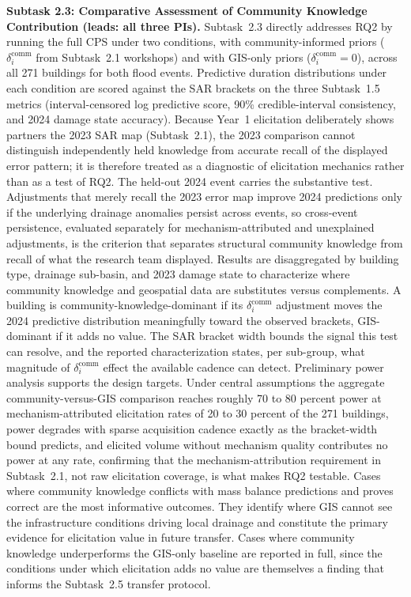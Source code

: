 \documentclass[11pt]{article}
\begin{document}
\textbf{Subtask 2.3: Comparative Assessment of Community Knowledge Contribution
(leads: all three PIs).}
Subtask~2.3 directly addresses RQ2 by running the full CPS under two conditions,
with community-informed priors ($\delta_i^{\mathrm{comm}}$ from Subtask~2.1
workshops) and with GIS-only priors ($\delta_i^{\mathrm{comm}} = 0$), across
all 271 buildings for both flood events.
Predictive duration distributions under each condition are scored against the SAR brackets on the three Subtask~1.5 metrics (interval-censored log predictive score, 90\% credible-interval consistency, and 2024 damage state accuracy).
Because Year~1 elicitation deliberately shows partners the 2023 SAR map
(Subtask~2.1), the 2023 comparison cannot distinguish independently held
knowledge from accurate recall of the displayed error pattern; it is therefore
treated as a diagnostic of elicitation mechanics rather than as a test of RQ2.
The held-out 2024 event carries the substantive test. Adjustments that merely
recall the 2023 error map improve 2024 predictions only if the underlying
drainage anomalies persist across events, so cross-event persistence, evaluated
separately for mechanism-attributed and unexplained adjustments, is the
criterion that separates structural community knowledge from recall of what the
research team displayed.
Results are disaggregated by building type, drainage sub-basin, and 2023 damage state to characterize where community knowledge and geospatial data are substitutes versus complements. A building is community-knowledge-dominant if its $\delta_i^{\mathrm{comm}}$ adjustment moves the 2024 predictive distribution meaningfully toward the observed brackets, GIS-dominant if it adds no value. The SAR bracket width bounds the signal this test can resolve, and the reported characterization states, per sub-group, what magnitude of $\delta_i^{\mathrm{comm}}$ effect the available cadence can detect.
Preliminary power analysis supports the design targets. Under central assumptions the aggregate
community-versus-GIS comparison reaches roughly 70 to 80 percent power at
mechanism-attributed elicitation rates of 20 to 30 percent of the 271 buildings,
power degrades with sparse acquisition cadence exactly as the bracket-width
bound predicts, and elicited volume without mechanism quality contributes no
power at any rate, confirming that the mechanism-attribution requirement in
Subtask~2.1, not raw elicitation coverage, is what makes RQ2 testable.
Cases where community knowledge conflicts with mass balance predictions and proves correct are the most informative outcomes. They identify where GIS cannot see the infrastructure conditions driving local drainage and constitute the primary evidence for elicitation value in future transfer. Cases where community knowledge underperforms the GIS-only baseline are reported in full, since the conditions under which elicitation adds no value are themselves a finding that informs the Subtask~2.5 transfer protocol.
\end{document}
